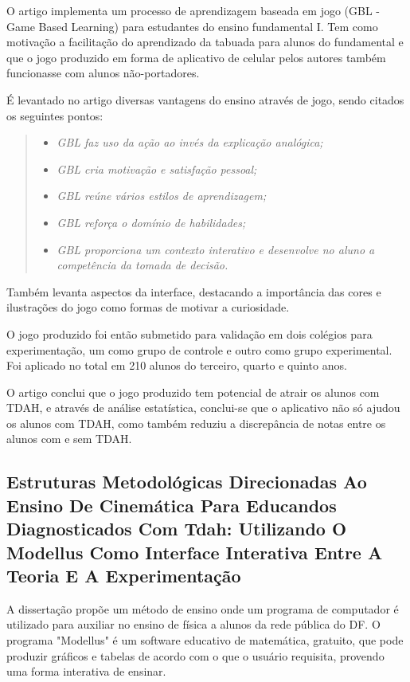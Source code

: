O artigo\cite{sanchez} implementa um processo de aprendizagem baseada em jogo (GBL - Game Based Learning) para estudantes do ensino fundamental I. Tem como motivação a facilitação do aprendizado da tabuada para alunos do fundamental e que o jogo produzido em forma de aplicativo de celular pelos autores também funcionasse com alunos não-portadores.

É levantado no artigo diversas vantagens do ensino através de jogo, sendo citados os seguintes pontos:

\begin{quote}
\begin{itemize}
\item \textit{GBL faz uso da ação ao invés da explicação analógica;}
\item \textit{GBL cria motivação e satisfação pessoal;}
\item \textit{GBL reúne vários estilos de aprendizagem;}
\item \textit{GBL reforça o domínio de habilidades;}
\item \textit{GBL proporciona um contexto interativo e desenvolve no aluno a competência da tomada de decisão.}
\end{itemize}
\cite{sanchez}
\end{quote}

Também levanta aspectos da interface, destacando a importância das cores e ilustrações do jogo como formas de motivar a curiosidade. 

O jogo produzido foi então submetido para validação em dois colégios para experimentação, um como grupo de controle e outro como grupo experimental. Foi aplicado no total em 210 alunos do terceiro, quarto e quinto anos.

O artigo conclui que o jogo produzido tem potencial de atrair os alunos com TDAH, e através de análise estatística, conclui-se que o aplicativo não só ajudou os alunos com TDAH, como também reduziu a discrepância de notas entre os alunos com e sem TDAH.


\subsection{Estruturas Metodológicas Direcionadas Ao Ensino De Cinemática Para Educandos Diagnosticados Com Tdah: Utilizando O Modellus Como Interface Interativa Entre A Teoria E A Experimentação}

A dissertação\cite{gomides} propõe um método de ensino onde um programa de computador é utilizado para auxiliar no ensino de física a alunos da rede pública do DF. O programa "Modellus" é um software educativo de matemática, gratuito, que pode produzir gráficos e tabelas de acordo com o que o usuário requisita, provendo uma forma interativa de ensinar.

